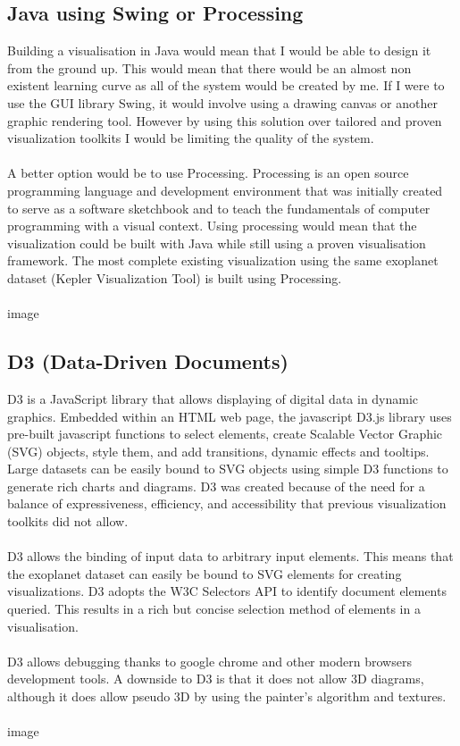 \documentclass[11pt
              , a4paper
              , twoside
              , openright
              ]{report}
\begin{document}
\subsection{Java using Swing or Processing}
Building a visualisation in Java would mean that I would be able to design it from the ground up. This would mean that there would be an almost non existent learning curve as all of the system would be created by me.  If I were to use the GUI library Swing, it would involve using a drawing canvas or another graphic rendering tool. However by using this solution over tailored and  proven visualization toolkits I would be limiting the quality of the system.
\\\\
A better option would be to use Processing. Processing is an open source programming language and development environment that was initially created to serve as a software sketchbook and to teach the fundamentals of computer programming with a visual context. Using processing would mean that the visualization could be built with Java while still using a proven visualisation framework. The most complete existing visualization using the same exoplanet dataset (Kepler Visualization Tool) is built using Processing. 
\\\\
image
\subsection{D3 (Data-Driven Documents)}
D3 is a JavaScript library that allows displaying of digital data in dynamic graphics. Embedded within an HTML web page, the javascript D3.js library uses pre-built javascript functions to select elements, create Scalable Vector Graphic (SVG) objects, style them, and add transitions, dynamic effects and tooltips. Large datasets can be easily bound to SVG objects using simple D3 functions to generate rich charts and diagrams. D3 was created because of the need for a balance of expressiveness, efficiency, and accessibility that previous visualization toolkits did not allow. 
\\\\
D3 allows the binding of input data to arbitrary input elements. This means that the exoplanet dataset can easily be bound to SVG elements for creating visualizations. D3 adopts the W3C Selectors API to identify document elements queried. This results in a rich but concise selection method of elements in a visualisation. 
\\\\
D3 allows debugging thanks to google chrome and other modern browsers development tools. A downside to D3 is that it does not allow 3D diagrams, although it does allow pseudo 3D by using the painter's algorithm and textures.
\\\\
image
\end{document}
